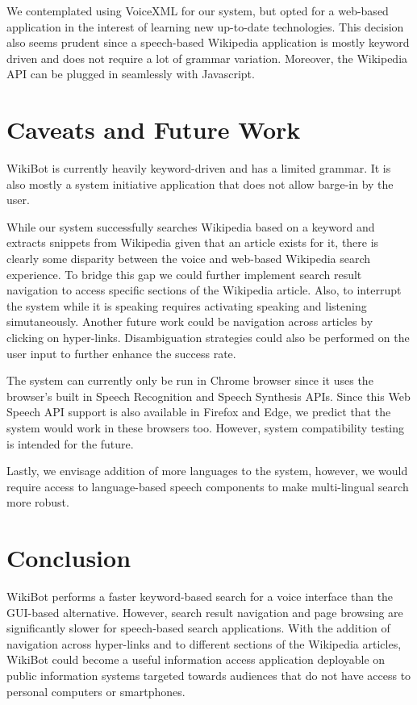 \documentclass[11pt,a4paper]{article}
\begin{document}
We contemplated using VoiceXML for our system, but opted for a web-based application in the interest of learning new up-to-date technologies. This decision also seems prudent since a speech-based Wikipedia application is mostly keyword driven and does not require a lot of grammar variation. Moreover, the Wikipedia API can be plugged in seamlessly with Javascript. 

\section{Caveats and Future Work}
WikiBot is currently heavily keyword-driven and has a limited grammar. It is also mostly a system initiative application that does not allow barge-in by the user. 

While our system successfully searches Wikipedia based on a keyword and extracts snippets from Wikipedia given that an article exists for it, there is clearly some disparity between the voice and web-based Wikipedia search experience. To bridge this gap we could further implement search result navigation to access specific sections of the Wikipedia article. Also, to interrupt the system while it is speaking requires activating speaking and listening simutaneously. Another future work could be navigation across articles by clicking on hyper-links. Disambiguation strategies could also be performed on the user input to further enhance the success rate.

The system can currently only be run in Chrome browser since it uses the browser's built in Speech Recognition and Speech Synthesis APIs. Since this Web Speech API support is also available in Firefox and Edge, we predict that the system would work in these browsers too. However, system compatibility testing is intended for the future.

Lastly, we envisage addition of more languages to the system, however, we would require access to language-based speech components to make multi-lingual search more robust.

\section{Conclusion}
WikiBot performs a faster keyword-based search for a voice interface than the GUI-based alternative. However, search result navigation and page browsing are significantly slower for speech-based search applications. With the addition of navigation across hyper-links and to different sections of the Wikipedia articles, WikiBot could become a useful information access application deployable on public information systems targeted towards audiences that do not have access to personal computers or smartphones. 
\end{document}
